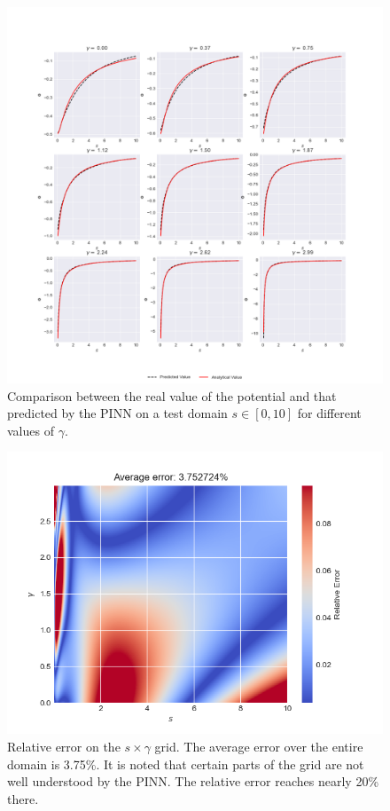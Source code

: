 \begin{figure}
    \centering
    \includegraphics[width=\textwidth]{imgs/test-plot-dehnen.png}
    \caption{Comparison between the real value of the potential and that predicted by the PINN on a test domain $s \in [0, 10]$ for different values of $\gamma$.}
    \label{fig:test-plot-dehnen}
\end{figure}

\begin{figure}
    \centering
    \includegraphics[width=\textwidth]{imgs/relative-error-dehnen.png}
    \caption{Relative error on the $s \times \gamma$ grid. The average error over the entire domain is 3.75\%. It is noted that certain parts of the grid are not well understood by the PINN. The relative error reaches nearly 20\% there.}
    \label{fig:relative-error-dehnen}
\end{figure}

